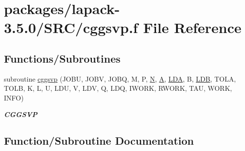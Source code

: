 \hypertarget{cggsvp_8f}{}\section{packages/lapack-\/3.5.0/\+S\+R\+C/cggsvp.f File Reference}
\label{cggsvp_8f}
\subsection*{Functions/\+Subroutines}
\begin{DoxyCompactItemize}
\item 
subroutine \hyperlink{cggsvp_8f_a4b549630343b55f63bdffaef2c3e18e2}{cggsvp} (J\+O\+B\+U, J\+O\+B\+V, J\+O\+B\+Q, M, P, \hyperlink{polmisc_8c_a0240ac851181b84ac374872dc5434ee4}{N}, \hyperlink{classA}{A}, \hyperlink{example__user_8c_ae946da542ce0db94dced19b2ecefd1aa}{L\+D\+A}, B, \hyperlink{example__user_8c_a50e90a7104df172b5a89a06c47fcca04}{L\+D\+B}, T\+O\+L\+A, T\+O\+L\+B, K, L, U, L\+D\+U, V, L\+D\+V, Q, L\+D\+Q, I\+W\+O\+R\+K, R\+W\+O\+R\+K, T\+A\+U, W\+O\+R\+K, I\+N\+F\+O)
\begin{DoxyCompactList}\small\item\em {\bfseries C\+G\+G\+S\+V\+P} \end{DoxyCompactList}\end{DoxyCompactItemize}


\subsection{Function/\+Subroutine Documentation}
\hypertarget{cggsvp_8f_a4b549630343b55f63bdffaef2c3e18e2}{}
